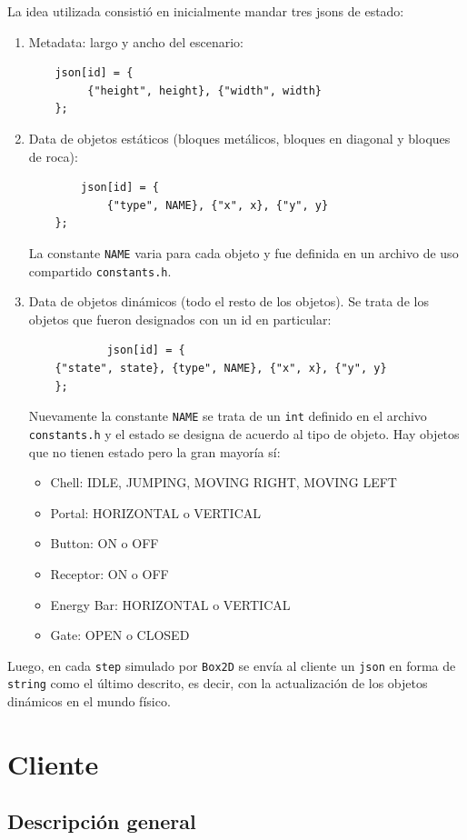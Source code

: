 \documentclass[a4paper]{article}
\begin{document}
La idea utilizada consistió en inicialmente mandar tres jsons de estado:
\begin{enumerate}
	\item Metadata: largo y ancho del escenario:
	\begin{verbatim}
	json[id] = {
		 {"height", height}, {"width", width}
	};
	\end{verbatim}
	\item Data de objetos estáticos (bloques metálicos, bloques en diagonal y bloques de roca):
	\begin{verbatim}
		json[id] = {
			{"type", NAME}, {"x", x}, {"y", y}
	};
	\end{verbatim}
	La constante \texttt{NAME} varia para cada objeto y fue definida en un archivo de uso compartido \texttt{constants.h}.
	\item Data de objetos dinámicos (todo el resto de los objetos). Se trata de los objetos que fueron designados con un id en particular:
	\begin{verbatim}
			json[id] = {
	{"state", state}, {type", NAME}, {"x", x}, {"y", y}
	};
	\end{verbatim}
	Nuevamente la constante \texttt{NAME} se trata de un \texttt{int} definido en el archivo \texttt{constants.h} y el estado se designa de acuerdo al tipo de objeto. Hay objetos que no tienen estado pero la gran mayoría sí:
	\begin{itemize}
		\item Chell: IDLE, JUMPING, MOVING RIGHT, MOVING LEFT
		\item Portal: HORIZONTAL o VERTICAL
		\item Button: ON o OFF
		\item Receptor: ON o OFF
		\item Energy Bar: HORIZONTAL o VERTICAL
		\item Gate: OPEN o CLOSED
	\end{itemize}
\end{enumerate}

Luego, en cada \texttt{step} simulado por \texttt{Box2D} se envía al cliente un \texttt{json} en forma de \texttt{string} como el último descrito, es decir, con la actualización de los objetos dinámicos en el mundo físico.

\section{Cliente}

\subsection{Descripción general}
\end{document}

